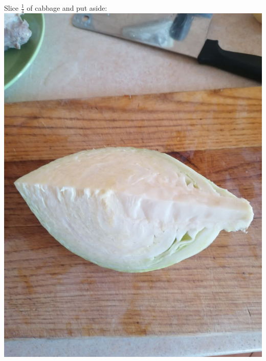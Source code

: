 \documentclass[11pt,a4paper]{article}
\begin{document}
Slice $\frac{1}{4}$ of cabbage and put aside: \\
\includegraphics[width=\textwidth]{5.jpg}
\end{document}
